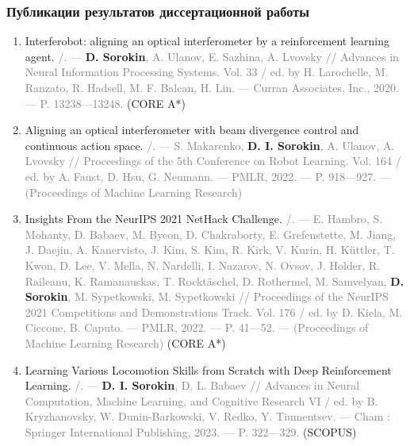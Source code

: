 \begin{frame}[t,allowframebreaks] %
\frametitle{Публикации результатов диссертационной работы}

\begin{enumerate}
\fontsize{10pt}{10pt}\selectfont
    \item Interferobot: aligning an optical interferometer by a reinforcement learning agent. \textcolor{gray}{/. –– }\textbf{D. Sorokin}\textcolor{gray}{, A. Ulanov, E. Sazhina, A. Lvovsky // Advances in Neural Information Processing Systems. Vol. 33 / ed. by H. Larochelle, M. Ranzato, R. Hadsell, M. F. Balcan, H. Lin. –– Curran Associates, Inc., 2020. –– P. 13238––13248.} (CORE A*)
    \item Aligning an optical interferometer with beam divergence control and continuous action space. \textcolor{gray}{/. –– S. Makarenko,} \textbf{D. I. Sorokin}\textcolor{gray}{, A. Ulanov, A. Lvovsky // Proceedings of the 5th Conference on Robot Learning. Vol. 164 / ed. by A. Faust, D. Hsu, G. Neumann. –– PMLR, 2022. –– P. 918––927. –– (Proceedings of Machine Learning Research)}
    \item Insights From the NeurIPS 2021 NetHack Challenge. \textcolor{gray}{/. –– E. Hambro, S. Mohanty, D. Babaev, M. Byeon, D. Chakraborty, E. Grefenstette, M. Jiang, J. Daejin, A. Kanervisto, J. Kim, S. Kim, R. Kirk, V. Kurin, H. Küttler, T. Kwon, D. Lee, V. Mella, N. Nardelli, I. Nazarov, N. Ovsov, J. Holder, R. Raileanu, K. Ramanauskas, T. Rocktäschel, D. Rothermel, M. Samvelyan,} \textbf{D. Sorokin}\textcolor{gray}{, M. Sypetkowski, M. Sypetkowski // Proceedings of the NeurIPS 2021 Competitions and Demonstrations Track. Vol. 176 / ed. by D. Kiela, M. Ciccone, B. Caputo. –– PMLR, 2022. –– P. 41––52. –– (Proceedings of Machine Learning Research)} (CORE A*)
    \item Learning Various Locomotion Skills from Scratch with Deep Reinforcement Learning. \textcolor{gray}{/. –– }\textbf{D. I. Sorokin}\textcolor{gray}{, D. L. Babaev // Advances in Neural Computation, Machine Learning, and Cognitive Research VI / ed. by B. Kryzhanovsky, W. Dunin-Barkowski, V. Redko, Y. Tiumentsev. –– Cham : Springer International Publishing, 2023. –– P. 322––329.} (SCOPUS)
\end{enumerate}
    
\end{frame}

